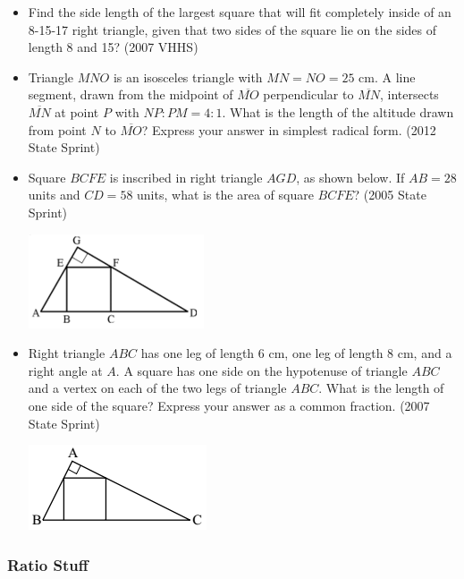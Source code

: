 \documentclass{article}
\begin{document}
\begin{itemize}
\item Find the side length of the largest square that will fit completely inside of an 8-15-17 right triangle, given that two sides of the square lie on the sides of length 8 and 15? (2007 VHHS)

\item Triangle $MNO$ is an isosceles triangle with $MN=NO=25$ cm. A line segment, drawn from the midpoint of $\overline{MO}$ perpendicular to $\overline{MN}$, intersects $\overline{MN}$ at point $P$ with $NP:PM=4:1$. What is the length of the altitude drawn from point $N$ to $\overline{MO}$? Express your answer in simplest radical form. (2012 State Sprint)

\item Square $BCFE$ is inscribed in right triangle $AGD$, as shown below. If $AB=28$ units and $CD=58$ units, what is the area of square $BCFE$? (2005 State Sprint)

\centerline{\includegraphics{200529.png}}

\item Right triangle $ABC$ has one leg of length 6 cm, one leg of length 8 cm, and a right angle at $A$. A square has one side on the hypotenuse of triangle $ABC$ and a vertex on each of the two legs of triangle $ABC$. What is the length of one side of the square? Express your answer as a common fraction. (2007 State Sprint)

\centerline{\includegraphics{200730.png}}

\end{itemize}

\subsubsection{Ratio Stuff}
\end{document}
